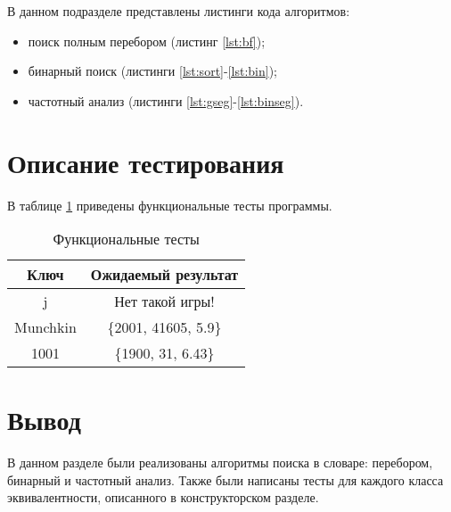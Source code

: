 В данном подразделе представлены листинги кода алгоритмов:
\begin{itemize}[]
    \item поиск полным перебором (листинг \ref{lst:bf});
    \item бинарный поиск (листинги \ref{lst:sort}-\ref{lst:bin});
    \item частотный анализ (листинги \ref{lst:gseg}-\ref{lst:binseg}).
\end{itemize}







\section{Описание тестирования}

В таблице \ref{tab:tests} приведены функциональные тесты программы.

\begin{table}[h!]
	\begin{center}
    \begin{threeparttable}
        \captionsetup{justification=raggedright,singlelinecheck=off}
        \caption{\label{tab:tests}Функциональные тесты}
        \begin{tabular}{|c|c|}
			\hline
            \textbf{Ключ} & \textbf{Ожидаемый результат} \\ [2mm]
            \hline
            j
            &
            Нет такой игры!
            \\
            \hline
            Munchkin
            &
            \{2001, 41605, 5.9\}
            \\
            \hline
            1001
            &
            \{1900, 31, 6.43\}
            \\
            \hline
		\end{tabular}
    \end{threeparttable} 
	\end{center}
\end{table}

\section{Вывод}

В данном разделе были реализованы алгоритмы поиска в словаре: перебором,
бинарный и частотный анализ. Также были написаны тесты для каждого класса
эквивалентности, описанного в конструкторском разделе.
